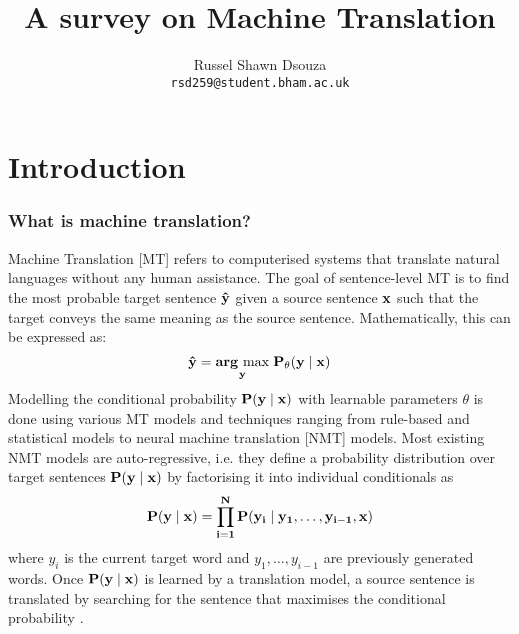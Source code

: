 \documentclass[11pt]{article}
\title{A survey on Machine Translation}
\author{
  Russel Shawn Dsouza \\
  \texttt{rsd259@student.bham.ac.uk} \\
}
\begin{document}
\maketitle
\thispagestyle{fancy}

\vspace{-2.5em}
\section{Introduction} \vspace{-0.7em}
\subsubsection*{What is machine translation?} \vspace{-2mm}
Machine Translation [MT] refers to computerised systems that translate natural languages without any human assistance.
The goal of sentence-level MT is to find the most probable target sentence $\bf \hat y$ given a source sentence $\bf x$ such that the target conveys the same meaning as the source sentence. Mathematically, this can be expressed as:
\begin{equation}
    \bf{\hat y} = \underset{\bf y}{arg\,\max}\; P_{\theta} (\bf y \mid \bf x)
\end{equation}
Modelling the conditional probability $\bf P(\bf y \mid \bf x)$ with learnable parameters $\theta$ is done using various MT models and techniques ranging from rule-based and statistical models to neural machine translation [NMT] models.
Most existing NMT models are auto-regressive, i.e. they define a probability distribution over target sentences $\bf P(\bf y \mid \bf x)$ by factorising it into individual conditionals as 
\begin{equation}\label{eq:inddist}
    \bf P(\bf y \mid \bf x)  = \prod_{i = 1}^{N} \bf P(y_i \mid y_1, \ldots, y_{i - 1}, \bf x)
\end{equation}
where $y_i$ is the current target word and $y_1, \ldots, y_{i - 1}$ are previously generated words.
Once $\bf P(\bf y \mid \bf x)$ is learned by a translation model, a source sentence is translated by searching for the sentence that maximises the conditional probability \citep{sutskever2014sequence, maruf2021survey}.
\end{document}
